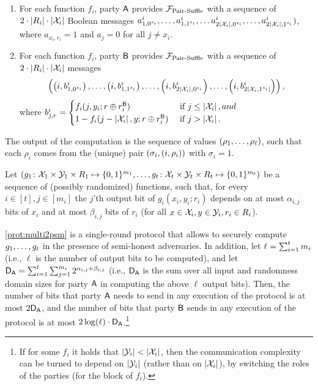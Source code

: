 \begin{protocol} 
\begin{description}
\begin{enumerate}
\item For each function $f_i$, party $\mathsf{A}$ provides ${\cal F}_{\operatorname{Pair-Suffle}}$ with a sequence of  $2\cdot\left|R_i\right|\cdot\left|\mathcal{X}_i\right|$ Boolean messages $a^i_{1,0^{s_i}}, \ldots,a^i_{1,1^{s_i}}, \ldots a^i_{2\left|\mathcal{X}_i\right|,0^{s_i}}, \ldots, a^i_{2\left|\mathcal{X}_i\right|,1^{s_i}})$, where $a_{x_i,r_i}=1$ and $a_j=0$ for all $j\neq x_i$. 

\item For each function $f_i$, party $\mathsf{B}$ provides ${\cal F}_{\operatorname{Pair-Suffle}}$ with a sequence of  $2\cdot\left|R_i\right|\cdot\left|\mathcal{X}_i\right|$ messages $$\left(\left(i,b^i_{1,0^{s_i}}\right),  \ldots,\left(i,b^i_{1,1^{s_i}}\right), \ldots, \left(i,b^i_{2\left|\mathcal{X}_i\right|,0^{s_i}}\right), \ldots, \left(i,b^i_{2\left|\mathcal{X}_i,1^{s_i}\right|}\right)\right),$$ 
where
$ b^i_{j,r}=
\begin{cases}
f_i(j,y_i;r\oplus r_i^{\mathsf{B}}) & \text{ if } j\leq \left|\mathcal{X}_i\right|, and\\
1-f_i(j-\left|\mathcal{X}_i\right|,y;r\oplus r_i^{\mathsf{B}})  & \text{ if } j> \left|\mathcal{X}_i\right|.
\end{cases}$ 
\end{enumerate}
\item[Output:] The output of the computation is the sequence of values $\left(\rho_1, \ldots, \rho_{\ell}\right)$, such that each $\rho_i$ comes from the (unique) pair $\left( \sigma_i,\left(i,\rho_i\right)\right)$ with $\sigma_i = 1$.
\end{description}
\end{protocol}


\begin{theorem}\label{thm:multi2psm}
Let  
$\left(g_1\colon\mathcal{X}_1\times\mathcal{Y}_1\times R_1\mapsto\{0,1\}^{m_1}, \ldots, g_{t}\colon \mathcal{X}_{t}\times\mathcal{Y}_{t}\times R_{t}\mapsto\{0,1\}^{m_{t}}\right)$ be a sequence of (possibly randomized)  functions, such that, for every $i\in [t], j\in[m_i]$ the $j$'th output bit of $g_i(x_i,y_i;r_i)$ depends on at most $\alpha_{i,j}$ bits of $x_i$ and at most $\beta_{i,j}$ bits of $r_i$ (for all $x\in\mathcal{X}_i,y\in\mathcal{Y}_i,r_i\in R_i$).


\cref{prot:multi2psm} is a single-round protocol that allows to securely compute $g_1, \ldots, g_{t}$ in the presence of semi-honest adversaries. 
In addition, let $\ell = \sum_{i=1}^{t}m_i$ (i.e., $\ell$ is the number of output bits to be computed), and let ${{\mathsf{D}}}_{\mathsf{A}} = \sum_{i=1}^{t}\sum_{j=1}^{m_i} 2^{\alpha_{i,j}+\beta_{i,j}}$ (i.e., ${{\mathsf{D}}}_{\mathsf{A}}$ is the sum over all input and randomness domain sizes for party $\mathsf{A}$ in computing the above $\ell$ output bits).
Then, the number of bits that party $\mathsf{A}$ needs to send in any execution of the protocol is at most $2{{\mathsf{D}}}_{\mathsf{A}}$, and the number of bits that party $\mathsf{B}$ sends in any execution of the protocol is at most $2\log(\ell)\cdot{{\mathsf{D}}}_{\mathsf{A}}$.\footnote{If for some $f_i$ it holds that $\left|\mathcal{Y}_i\right|<\left|\mathcal{X}_i\right|$, then the communication complexity can be turned to depend on $\left|\mathcal{Y}_i\right|$ (rather than on $\left|\mathcal{X}_i\right|$), by switching the roles of the parties (for the block of $f_i$).}
\end{theorem}


